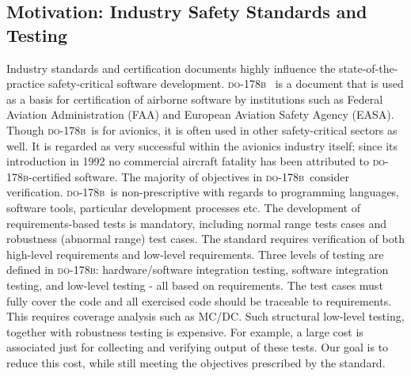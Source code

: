 \documentclass[sttt,final]{svjour}
\newcommand{\DOB}{\textsc{do-178b}}
\begin{document}
\subsection{Motivation: Industry Safety Standards and Testing}
Industry standards and certification documents highly influence the
state-of-the-practice safety-critical software development. \DOB\
\cite{do178b} is a document that is used as a basis for certification
of airborne software by institutions such as Federal Aviation
Administration (FAA) and European Aviation Safety Agency
(EASA). Though \DOB\ is for avionics, it is often used in other
safety-critical sectors as well. It is regarded as very successful
within the avionics industry itself; since its introduction in 1992 no
commercial aircraft fatality has been attributed to \DOB-certified
software. The majority of objectives in \DOB\ consider
verification. \DOB\ is non-prescriptive with regards to programming
languages, software tools, particular development processes etc. The
development of requirements-based tests is mandatory, including normal
range tests cases and robustness (abnormal range) test cases. The
standard requires verification of both high-level requirements and
low-level requirements. Three levels of testing are defined in \DOB:
hardware/software integration testing, software integration testing,
and low-level testing - all based on requirements. The test cases must
fully cover the code and all exercised code should be traceable to
requirements. This requires coverage analysis such as MC/DC. Such
structural low-level testing, together with robustness testing is
expensive. For example, a large cost is associated just for collecting
and verifying output of these tests. Our goal is to reduce this cost,
while still meeting the objectives prescribed by the standard.
\end{document}

